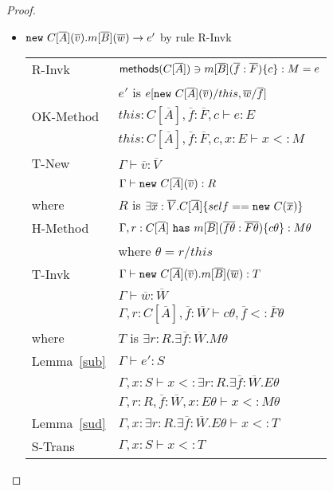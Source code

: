 \documentclass[preprint,nocopyrightspace,9pt]{sigplanconf}
\begin{document}
\begin{proof}
\begin{itemize}
\item ${\tt new}~C[\overline{A}](\overline{v}).m[\overline{B}](\overline{w}) \rightarrow e'$ by rule {\sc R-Invk}
\\
\begin{tabular}{ll}
{\sc R-Invk} & ${\sf methods}(C[\overline{A}]) \ni m[\overline{B}](\overline{f}:\overline{F})\{c\}:M=e$
\\
& $e'$ is $e[{\tt new}~C[\overline{A}](\overline{v})/this,\overline{w}/\overline{f}]$
\\
{\sc OK-Method} & $this:C[\overline{A}],\overline{f}:\overline{F},c\vdash e:E$
\\
& $this:C[\overline{A}],\overline{f}:\overline{F},c,x:E\vdash x<:M$
\\
{\sc T-New} & $\Gamma\vdash\overline{v}:\overline{V}$
\\
& $\Gamma\vdash{\tt new}~C[\overline{A}](\overline{v}):R$
\\
where & $R$ is $\exists\overline{x}:\overline{V}.C[\overline{A}]\{self=={\tt new}~C(\overline{x})\}$
\\
{\sc H-Method} & $\Gamma, r:C[\overline{A}]~{\tt has}~m[\overline{B}](\overline{f\theta}:\overline{F\theta})\{c\theta\}:M\theta$
\\
& where $\theta=r/this$
\\
{\sc T-Invk} & $\Gamma\vdash{\tt new}~C[\overline{A}](\overline{v}).m[\overline{B}](\overline{w}):T$
\\
& $\Gamma\vdash\overline{w}:\overline{W}$
\\
& $\Gamma,r:C[\overline{A}],\overline{f}:\overline{W}\vdash c\theta, \overline f<:\overline{F}\theta$
\\
where & $T$ is $\exists r:R.\exists \overline{f}:\overline{W}.M\theta$
\\
Lemma~\ref{sub} & $\Gamma\vdash e':S$
\\
& $\Gamma,x:S\vdash x<:\exists r:R.\exists \overline{f}:\overline{W}.E\theta$
\\
& $\Gamma,r:R,\overline{f}:\overline{W},x:E\theta\vdash x<:M\theta$
\\
Lemma~\ref{sud} & $\Gamma,x:\exists r:R.\exists \overline{f}:\overline{W}.E\theta\vdash x<:T$
\\
{\sc S-Trans} & $\Gamma,x:S\vdash x<:T$
\end{tabular}



\end{itemize}
\end{proof}
\end{document}
